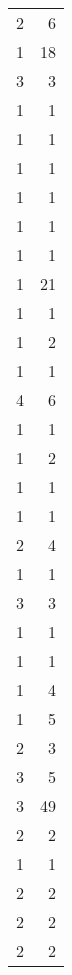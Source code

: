 \begin{tabular}{rr}
                  2 &             6 \\
                  1 &            18 \\
                  3 &             3 \\
                  1 &             1 \\
                  1 &             1 \\
                  1 &             1 \\
                  1 &             1 \\
                  1 &             1 \\
                  1 &             1 \\
                  1 &            21 \\
                  1 &             1 \\
                  1 &             2 \\
                  1 &             1 \\
                  4 &             6 \\
                  1 &             1 \\
                  1 &             2 \\
                  1 &             1 \\
                  1 &             1 \\
                  2 &             4 \\
                  1 &             1 \\
                  3 &             3 \\
                  1 &             1 \\
                  1 &             1 \\
                  1 &             4 \\
                  1 &             5 \\
                  2 &             3 \\
                  3 &             5 \\
                  3 &            49 \\
                  2 &             2 \\
                  1 &             1 \\
                  2 &             2 \\
                  2 &             2 \\
                  2 &             2 \\

\end{tabular}
